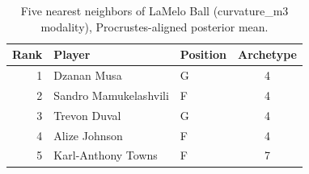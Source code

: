 \begin{table}[htbp]
  \centering\small
  \begin{tabular}{rllc}
    \toprule
    Rank & Player & Position & Archetype \\
    \midrule
    1 & Dzanan Musa & G & 4 \\
    2 & Sandro Mamukelashvili & F & 4 \\
    3 & Trevon Duval & G & 4 \\
    4 & Alize Johnson & F & 4 \\
    5 & Karl-Anthony Towns & F & 7 \\
    \bottomrule
  \end{tabular}
  \caption{Five nearest neighbors of LaMelo Ball (curvature_m3 modality), Procrustes-aligned posterior mean.}
  \label{tab:LaMelo_Ball_neighbors_curvature_m3}
\end{table}

